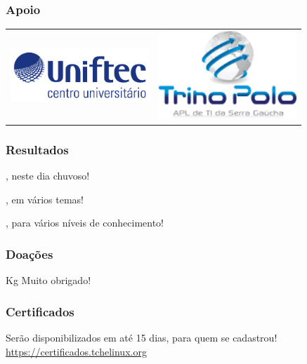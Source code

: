 \begin{frame}
    \frametitle{Apoio}
\begin{center}
\begin{tabular}[h]{cc}
\includegraphics[width=5.2cm]{images/UNIFTEC.png} &
\includegraphics[width=5.2cm]{images/trinopolo.png}
\end{tabular}
\end{center}
\end{frame}

\begin{frame}
    \frametitle{Resultados}

    \begin{description}[labelwidth=\widthof{\bfseries Participantes}]
    \item[Participantes] \participantes, neste dia chuvoso!
    \item[Palestrantes] \palestrantes, em vários temas!
    \item[Palestras] \palestras, para vários níveis de conhecimento!
    \end{description}

\end{frame}

\begin{frame}
    \frametitle{Doações}

    \begin{center}
    \vfill
        \Large \alimentos Kg \normalsize
    \vfill
        \Large \textbf{\caridade}
    \vfill
        \normalsize Muito obrigado!
    \vfill
    \end{center}

\end{frame}

\begin{frame}
    \frametitle{Certificados}

\begin{center}
Serão disponibilizados em até 15 dias, para quem se cadastrou!
\vfill
\large \url{https://certificados.tchelinux.org}
\end{center}

\end{frame}




